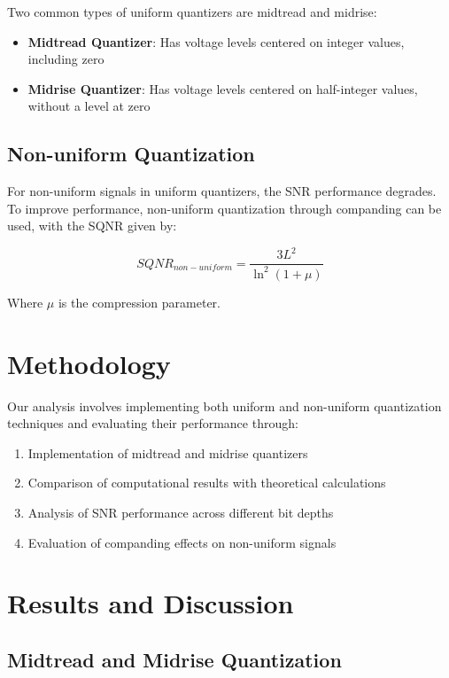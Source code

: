 \documentclass{article}
\begin{document}
Two common types of uniform quantizers are midtread and midrise:

\begin{itemize}
    \item \textbf{Midtread Quantizer}: Has voltage levels centered on integer values, including zero
    \item \textbf{Midrise Quantizer}: Has voltage levels centered on half-integer values, without a level at zero
\end{itemize}

\subsection{Non-uniform Quantization}

For non-uniform signals in uniform quantizers, the SNR performance degrades. To improve performance, non-uniform quantization through companding can be used, with the SQNR given by:

$$SQNR_{non-uniform} = \frac{3L^2}{\ln^2(1+\mu)}$$

Where $\mu$ is the compression parameter.

\section{Methodology}

Our analysis involves implementing both uniform and non-uniform quantization techniques and evaluating their performance through:

\begin{enumerate}
    \item Implementation of midtread and midrise quantizers
    \item Comparison of computational results with theoretical calculations
    \item Analysis of SNR performance across different bit depths
    \item Evaluation of companding effects on non-uniform signals
\end{enumerate}

\section{Results and Discussion}

\subsection{Midtread and Midrise Quantization}
\end{document}
